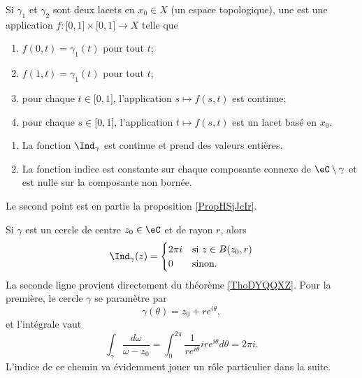 \begin{definition}  \label{DefECnFJQp}
    Si \( \gamma_1\) et \( \gamma_2\) sont deux lacets en \( x_0\in X\) (un espace topologique), une  est une application \( f\colon \mathopen[ 0 , 1 \mathclose]\times \mathopen[ 0 , 1 \mathclose]\to X\) telle que
    \begin{enumerate}
        \item
            \( f(0,t)=\gamma_1(t)\) pour tout \( t\);
        \item
            \( f(1,t)=\gamma_1(t)\) pour tout \( t\);
        \item
            pour chaque \( t\in \mathopen[ 0 , 1 \mathclose]\), l'application \( s\mapsto f(s,t)\) est continue;
        \item
            pour chaque \( s\in \mathopen[ 0 , 1 \mathclose]\), l'application \( t\mapsto f(s,t)\) est un lacet basé en \( x_0\).
    \end{enumerate}
\end{definition}

\begin{theorem}     \label{ThoDYQQXZ}
    \begin{enumerate}
        \item
            La fonction \( \Ind_{\gamma}\) est continue et prend des valeurs entières.
        \item
            La fonction indice est constante sur chaque composante connexe de \( \eC\setminus \gamma\) et est nulle sur la composante non bornée.
    \end{enumerate}
\end{theorem}
Le second point est en partie la proposition \ref{PropHSjJcIr}.

\begin{example} \label{ExradygL}
    Si \( \gamma\) est un cercle de centre \( z_0\in \eC\) et de rayon \( r\), alors 
    \begin{equation}
        \Ind_{\gamma}(z)=\begin{cases}
            2\pi i    &   \text{si \( z\in B(z_0,r)\)}\\
            0    &    \text{sinon}.
        \end{cases}
    \end{equation}
    La seconde ligne provient directement du théorème \ref{ThoDYQQXZ}. Pour la première, le cercle \( \gamma\) se paramètre par
    \begin{equation}
        \gamma(\theta)=z_0+r e^{i\theta},
    \end{equation}
    et l'intégrale vaut
    \begin{equation}
        \int_{\gamma}\frac{ d\omega }{ \omega-z_0 }=\int_0^{2\pi}\frac{1}{ r e^{i\theta} }ir e^{i\theta}d\theta=2\pi i.
    \end{equation}
    L'indice de ce chemin va évidemment jouer un rôle particulier dans la suite.
\end{example}

